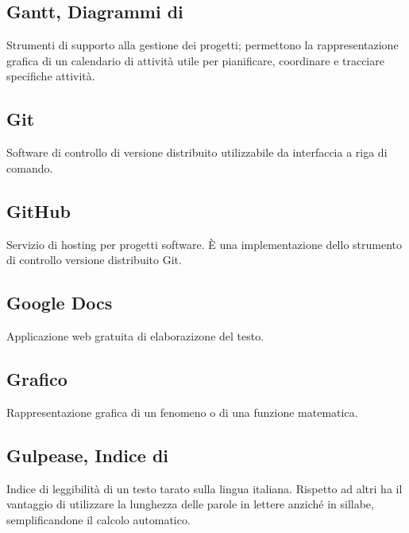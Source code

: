 \documentclass[../glossario.tex]{subfiles}
\begin{document}
\subsection*{Gantt, Diagrammi di}
Strumenti di supporto alla gestione dei progetti; permettono la rappresentazione grafica di un calendario di attività utile per pianificare, coordinare e tracciare specifiche attività.


\subsection*{Git}
Software di controllo di versione distribuito utilizzabile da interfaccia a riga di comando.

\subsection*{GitHub} 
Servizio di hosting per progetti software. È una implementazione dello strumento di controllo versione distribuito Git.

\subsection*{Google Docs} 
Applicazione web gratuita di elaborazizone del testo.

\subsection*{Grafico} 
Rappresentazione grafica di un fenomeno o di una funzione matematica.

\subsection*{Gulpease, Indice di}
Indice di leggibilità di un testo tarato sulla lingua italiana. Rispetto ad altri ha il vantaggio di utilizzare la lunghezza delle parole in lettere anziché in sillabe, semplificandone il calcolo automatico.

    
\end{document}
